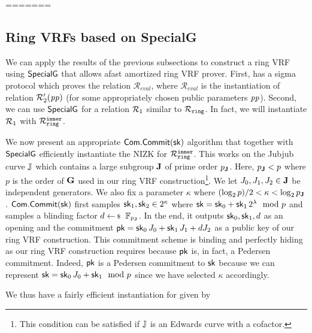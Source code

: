 =======
\subsection{Ring VRFs based on SpecialG}
\label{subsec:rvrf_faster}

We can apply the results of the previous subsections to construct a ring VRF using ${\mathsf{SpecialG}}$ that allows afast amortized ring VRF prover. 
First, \PedVRF has a sigma protocol which proves the relation $\mathcal{R}_{eval}$, 
where $\mathcal{R}_{eval}$ is the instantiation of relation $\mathcal{R}_2'(\mathit{pp})$ (for some appropriately chosen public parameters $\mathit{pp}$). Second, we can use ${\mathsf{SpecialG}}$ 
for a relation $\mathcal{R}_1$ similar to $\mathcal{R}_{\mathtt{ring}}$. In fact, we will instantiate $\mathcal{R}_1$ with $\mathcal{R}_{\mathtt{ring}}^{\mathtt{inner}}$. 


We now present an appropriate $ \mathsf{Com}.\mathsf{Commit}(\mathsf{sk}) $ algorithm that together with $ {\mathsf{SpecialG}} $ efficiently instantiate the NIZK for $ \mathcal{R}_{\mathtt{ring}}^{\mathtt{inner}} $. This works on the Jubjub curve ${\mathbb{J}}$ which contains a large subgroup ${\mathbf{J}}$ of prime order $p_{\mathbf{J}}$. Here, $p_{\mathbf{J}} < p$ where $ p $ is the order of ${\mathbf{G}}$ used in our ring VRF construction\footnote{This condition can be satisfied if ${\mathbb{J}}$ is an Edwards curve with a cofactor.}. We let $J_0,J_1,J_2 \in {\mathbf{J}}$ be independent generators. We also fix a parameter $ \kappa $ where $(\log_2 p)/2 < \kappa < \log_2 p_{\mathbf{J}}$. $ \mathsf{Com}.\mathsf{Commit}(\mathsf{sk}) $ first samples $\mathsf{sk}_1,\mathsf{sk}_2 \in 2^\kappa$  where $\mathsf{sk} = \mathsf{sk}_0 + \mathsf{sk}_1 \, 2^{\lambda} \mod p$ and samples a blinding factor $d \leftsample \F_{p_\grJ} $. In the end, it outputs $ \mathsf{sk}_0, \mathsf{sk}_1,d $ as an opening and the commitment $\mathsf{pk}=\mathsf{sk}_0\, J_0 + \mathsf{sk}_1\, J_1 + d J_2$ as a public key of our ring VRF construction. This commitment scheme is binding and perfectly hiding as our ring VRF construction requires because $ \mathsf{pk} $ is, in fact, a Pedersen commitment. Indeed, $\mathsf{pk}$ is a Pedersen commitment to $\mathsf{sk}$ because we can represent $ \mathsf{sk} = \mathsf{sk}_0\, J_0 + \mathsf{sk}_1 \mod p$ since we have selected $ \kappa $ accordingly.


We thus have a fairly efficient instantiation for \relone given by

